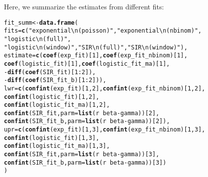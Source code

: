 \documentclass{article}\usepackage[]{graphicx}\usepackage[]{color}
\makeatletter
\newcommand{\hlnum}[1]{\textcolor[rgb]{0.686,0.059,0.569}{#1}}%
\newcommand{\hlstr}[1]{\textcolor[rgb]{0.192,0.494,0.8}{#1}}%
\newcommand{\hlopt}[1]{\textcolor[rgb]{0,0,0}{#1}}%
\newcommand{\hlstd}[1]{\textcolor[rgb]{0.345,0.345,0.345}{#1}}%
\newcommand{\hlkwb}[1]{\textcolor[rgb]{0.69,0.353,0.396}{#1}}%
\newcommand{\hlkwc}[1]{\textcolor[rgb]{0.333,0.667,0.333}{#1}}%
\newcommand{\hlkwd}[1]{\textcolor[rgb]{0.737,0.353,0.396}{\textbf{#1}}}%
\newenvironment{kframe}{%
 \def\at@end@of@kframe{}%
 \ifinner\ifhmode%
  \def\at@end@of@kframe{\end{minipage}}%
  \begin{minipage}{\columnwidth}%
 \fi\fi%
 \def\FrameCommand##1{\hskip\@totalleftmargin \hskip-\fboxsep
 \colorbox{shadecolor}{##1}\hskip-\fboxsep
     \hskip-\linewidth \hskip-\@totalleftmargin \hskip\columnwidth}%
 \MakeFramed {\advance\hsize-\width
   \@totalleftmargin\z@ \linewidth\hsize
   \@setminipage}}%
 {\par\unskip\endMakeFramed%
 \at@end@of@kframe}
\newenvironment{knitrout}{}{} %
\makeatother
\begin{document}
Here, we summarize the estimates from different fits:
\begin{knitrout}
\color{fgcolor}\begin{kframe}
\begin{alltt}
\hlstd{fit_summ} \hlkwb{<-} \hlkwd{data.frame}\hlstd{(}
    \hlkwc{fits}\hlstd{=}\hlkwd{c}\hlstd{(}\hlstr{"exponential\textbackslash{}n(poisson)"}\hlstd{,} \hlstr{"exponential\textbackslash{}n(nbinom)"}\hlstd{,}
           \hlstr{"logistic\textbackslash{}n(full)"}\hlstd{,}
           \hlstr{"logistic\textbackslash{}n(window)"}\hlstd{,} \hlstr{"SIR\textbackslash{}n(full)"}\hlstd{,} \hlstr{"SIR\textbackslash{}n(window)"}\hlstd{),}
    \hlkwc{estimate}\hlstd{=}\hlkwd{c}\hlstd{(}\hlkwd{coef}\hlstd{(exp_fit)[}\hlnum{1}\hlstd{],} \hlkwd{coef}\hlstd{(exp_fit_nbinom)[}\hlnum{1}\hlstd{],}
               \hlkwd{coef}\hlstd{(logistic_fit)[}\hlnum{1}\hlstd{],} \hlkwd{coef}\hlstd{(logistic_fit_ma)[}\hlnum{1}\hlstd{],}
               \hlopt{-}\hlkwd{diff}\hlstd{(}\hlkwd{coef}\hlstd{(SIR_fit)[}\hlnum{1}\hlopt{:}\hlnum{2}\hlstd{]),}
               \hlopt{-}\hlkwd{diff}\hlstd{(}\hlkwd{coef}\hlstd{(SIR_fit_b)[}\hlnum{1}\hlopt{:}\hlnum{2}\hlstd{])),}
    \hlkwc{lwr}\hlstd{=}\hlkwd{c}\hlstd{(}\hlkwd{confint}\hlstd{(exp_fit)[}\hlnum{1}\hlstd{,}\hlnum{2}\hlstd{],} \hlkwd{confint}\hlstd{(exp_fit_nbinom)[}\hlnum{1}\hlstd{,}\hlnum{2}\hlstd{],}
          \hlkwd{confint}\hlstd{(logistic_fit)[}\hlnum{1}\hlstd{,}\hlnum{2}\hlstd{],}
          \hlkwd{confint}\hlstd{(logistic_fit_ma)[}\hlnum{1}\hlstd{,}\hlnum{2}\hlstd{],}
          \hlkwd{confint}\hlstd{(SIR_fit,} \hlkwc{parm}\hlstd{=}\hlkwd{list}\hlstd{(r}\hlopt{~}\hlstd{beta}\hlopt{-}\hlstd{gamma))[}\hlnum{2}\hlstd{],}
          \hlkwd{confint}\hlstd{(SIR_fit_b,} \hlkwc{parm}\hlstd{=}\hlkwd{list}\hlstd{(r}\hlopt{~}\hlstd{beta}\hlopt{-}\hlstd{gamma))[}\hlnum{2}\hlstd{]),}
    \hlkwc{upr}\hlstd{=}\hlkwd{c}\hlstd{(}\hlkwd{confint}\hlstd{(exp_fit)[}\hlnum{1}\hlstd{,}\hlnum{3}\hlstd{],} \hlkwd{confint}\hlstd{(exp_fit_nbinom)[}\hlnum{1}\hlstd{,}\hlnum{3}\hlstd{],}
          \hlkwd{confint}\hlstd{(logistic_fit)[}\hlnum{1}\hlstd{,}\hlnum{3}\hlstd{],}
          \hlkwd{confint}\hlstd{(logistic_fit_ma)[}\hlnum{1}\hlstd{,}\hlnum{3}\hlstd{],}
          \hlkwd{confint}\hlstd{(SIR_fit,} \hlkwc{parm}\hlstd{=}\hlkwd{list}\hlstd{(r}\hlopt{~}\hlstd{beta}\hlopt{-}\hlstd{gamma))[}\hlnum{3}\hlstd{],}
          \hlkwd{confint}\hlstd{(SIR_fit_b,} \hlkwc{parm}\hlstd{=}\hlkwd{list}\hlstd{(r}\hlopt{~}\hlstd{beta}\hlopt{-}\hlstd{gamma))[}\hlnum{3}\hlstd{])}
\hlstd{)}


\end{alltt}
\end{kframe}
\end{knitrout}
\end{document}
